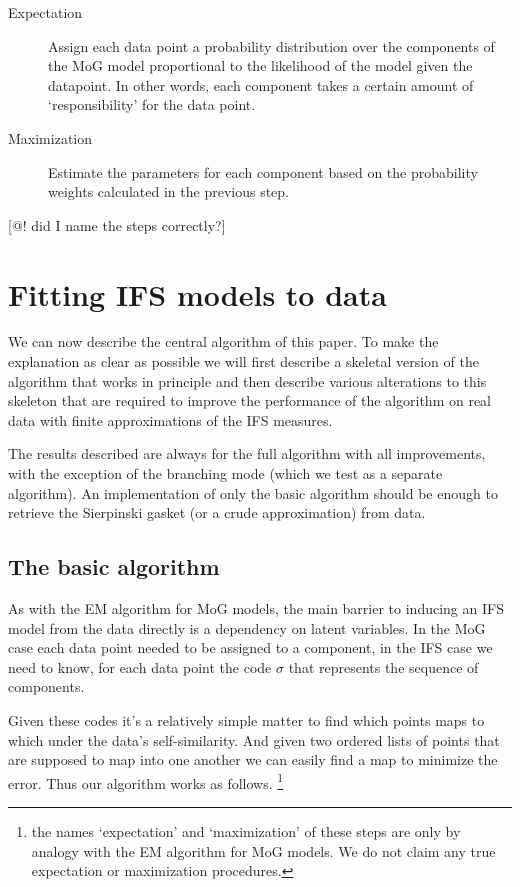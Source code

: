 \documentclass[10pt,a4paper,oneside]{article}
\theoremstyle{definition}
\begin{document}
\begin{description}
  \item[Expectation] Assign each data point a probability distribution over the components of the MoG model proportional to the likelihood of the model given the datapoint. In other words, each component takes a certain amount of `responsibility' for the data point.
  \item[Maximization] Estimate the parameters for each component based on the probability weights calculated in the previous step.  
\end{description} 

[@! did I name the steps correctly?] 

\section*{Fitting IFS models to data}

We can now describe the central algorithm of this paper. To make the explanation as clear as possible we will first describe a skeletal version of the algorithm that works in principle and then describe various alterations to this skeleton that are required to improve the performance of the algorithm on real data with finite approximations of the IFS measures. 

The results described are always for the full algorithm with all improvements, with the exception of the branching mode (which we test as a separate algorithm). An implementation of only the basic algorithm should be enough to retrieve the Sierpinski gasket (or a crude approximation) from data.

\subsection*{The basic algorithm}

As with the EM algorithm for MoG models, the main barrier to inducing an IFS model from the data directly is a dependency on latent variables. In the MoG case each data point needed to be assigned to a component, in the IFS case we need to know, for each data point the code $\sigma$ that represents the sequence of components. 

Given these codes it's a relatively simple matter to find which points maps to which under the data's self-similarity. And given two ordered lists of points that are supposed to map into one another we can easily find a map to minimize the error. Thus our algorithm works as follows. 
\footnote{the names `expectation' and `maximization' of these steps are only by analogy with the EM algorithm for MoG models. We do not claim any true expectation or maximization procedures.}
\end{document}
